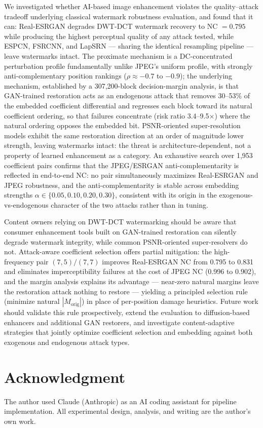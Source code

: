 \documentclass[conference]{IEEEtran}
\begin{document}
We investigated whether AI-based image enhancement violates the
quality--attack tradeoff underlying classical watermark robustness
evaluation, and found that it can: Real-ESRGAN degrades DWT-DCT
watermark recovery to NC $= 0.795$ while producing the highest perceptual
quality of any attack tested, while ESPCN, FSRCNN, and LapSRN ---
sharing the identical resampling pipeline --- leave watermarks intact.
The proximate mechanism is a DC-concentrated perturbation profile
fundamentally unlike JPEG's uniform profile, with strongly
anti-complementary position rankings ($\rho \approx -0.7$ to $-0.9$);
the underlying mechanism, established by a 307,200-block decision-margin
analysis, is that GAN-trained restoration acts as an endogenous attack
that removes 30--53\% of the embedded coefficient differential and
regresses each block toward its natural coefficient ordering, so that
failures concentrate (risk ratio 3.4--9.5$\times$) where the natural
ordering opposes the embedded bit. PSNR-oriented super-resolution
models exhibit the same restoration direction at an order of magnitude
lower strength, leaving watermarks intact: the threat is
architecture-dependent, not a property of learned enhancement as a
category. An exhaustive search over 1,953 coefficient pairs confirms
that the JPEG/ESRGAN anti-complementarity is reflected in end-to-end
NC: no pair simultaneously maximizes Real-ESRGAN and JPEG robustness,
and the anti-complementarity is stable across embedding strengths
$\alpha \in \{0.05, 0.10, 0.20, 0.30\}$, consistent with its origin in
the exogenous-vs-endogenous character of the two attacks rather than
in tuning.

Content owners relying on DWT-DCT watermarking should be aware that
consumer enhancement tools built on GAN-trained restoration can
silently degrade watermark integrity, while common PSNR-oriented
super-resolvers do not. Attack-aware coefficient selection offers
partial mitigation: the high-frequency pair $(7,5)/(7,7)$ improves
Real-ESRGAN NC from 0.795 to 0.831 and eliminates imperceptibility
failures at the cost of JPEG NC (0.996 to 0.902), and the margin
analysis explains its advantage --- near-zero natural margins leave the
restoration attack nothing to restore --- yielding a principled
selection rule (minimize natural $|M_{\mathrm{orig}}|$) in place of
per-position damage heuristics. Future work should validate this rule
prospectively, extend the evaluation to diffusion-based enhancers and
additional GAN restorers, and investigate content-adaptive strategies
that jointly optimize coefficient selection and embedding against both
exogenous and endogenous attack types.

\section*{Acknowledgment}
The author used Claude (Anthropic) as an AI coding assistant for
pipeline implementation. All experimental design, analysis, and writing
are the author's own work.



\end{document}
